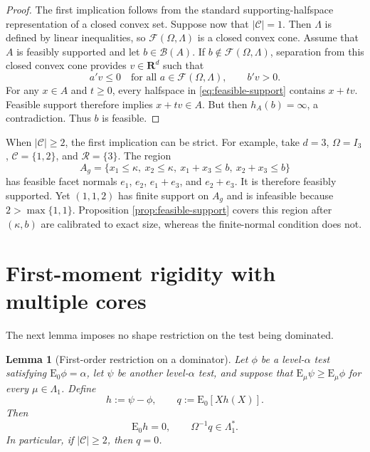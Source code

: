 \documentclass[12pt]{article}
\newtheorem{lemma}[theorem]{Lemma}
\theoremstyle{definition}
\theoremstyle{remark}
\newcommand{\E}{\mathrm E}
\newcommand{\R}{\mathbf R}
\newcommand{\cC}{\mathcal C}
\newcommand{\cR}{\mathcal R}
\newcommand{\cF}{\mathcal F}
\newcommand{\cB}{\mathcal B}
\newcommand{\1}{\mathbf 1}
\begin{document}
\begin{proof}
The first implication follows from the standard supporting-halfspace
representation of a closed convex set.  Suppose now that $|\cC|=1$.
Then $\Lambda$ is defined by linear inequalities, so
$\cF(\Omega,\Lambda)$ is a closed convex cone.  Assume that $A$ is
feasibly supported and let $b\in\cB(A)$.  If
$b\notin\cF(\Omega,\Lambda)$, separation from this closed convex cone
provides $v\in\R^d$ such that
\[
a'v\le0\quad\text{for all }a\in\cF(\Omega,\Lambda),
\qquad b'v>0.
\]
For any $x\in A$ and $t\ge0$, every halfspace in
\eqref{eq:feasible-support} contains $x+tv$.  Feasible support therefore
implies $x+tv\in A$.  But then $h_A(b)=\infty$, a contradiction.
Thus $b$ is feasible.
\end{proof}

When $|\cC|\ge2$, the first implication can be strict.  For example, take
$d=3$, $\Omega=I_3$, $\cC=\{1,2\}$, and $\cR=\{3\}$.  The region
\begin{equation}\label{eq:symmetric-gate-example}
A_g
=
\{x_1\le\kappa,\ x_2\le\kappa,\ x_1+x_3\le b,\ x_2+x_3\le b\}
\end{equation}
has feasible facet normals $e_1$, $e_2$, $e_1+e_3$, and $e_2+e_3$.
It is therefore feasibly supported.  Yet $(1,1,2)$ has finite support on
$A_g$ and is infeasible because $2>\max\{1,1\}$.  Proposition
\ref{prop:feasible-support} covers this region after $(\kappa,b)$ are
calibrated to exact size, whereas the finite-normal condition does not.

\section{First-moment rigidity with multiple cores}

The next lemma imposes no shape restriction on the test being dominated.

\begin{lemma}[First-order restriction on a dominator]\label{lem:first-order}
Let $\phi$ be a level-$\alpha$ test satisfying $\E_0\phi=\alpha$, let
$\psi$ be another level-$\alpha$ test, and suppose that
$\E_\mu\psi\ge\E_\mu\phi$ for every $\mu\in\Lambda_1$.  Define
\[
h:=\psi-\phi,
\qquad
q:=\E_0[Xh(X)].
\]
Then
\begin{equation}\label{eq:first-order-conclusion}
\E_0h=0,
\qquad
\Omega^{-1}q\in\Lambda_1^*.
\end{equation}
In particular, if $|\cC|\ge2$, then $q=0$.
\end{lemma}
\end{document}
